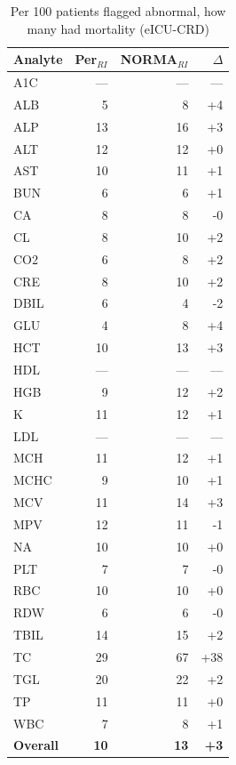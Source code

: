 \begin{table}[ht]
\centering
\footnotesize
\caption{Per 100 patients flagged abnormal, how many had mortality (eICU-CRD)}
\begin{tabular}{lrrr}
\toprule
Analyte & Per$_{RI}$ & NORMA$_{RI}$ & $\Delta$ \\
\midrule
A1C & --- & --- & --- \\
ALB & 5 & 8 & +4 \\
ALP & 13 & 16 & +3 \\
ALT & 12 & 12 & +0 \\
AST & 10 & 11 & +1 \\
BUN & 6 & 6 & +1 \\
CA & 8 & 8 & -0 \\
CL & 8 & 10 & +2 \\
CO2 & 6 & 8 & +2 \\
CRE & 8 & 10 & +2 \\
DBIL & 6 & 4 & -2 \\
GLU & 4 & 8 & +4 \\
HCT & 10 & 13 & +3 \\
HDL & --- & --- & --- \\
HGB & 9 & 12 & +2 \\
K & 11 & 12 & +1 \\
LDL & --- & --- & --- \\
MCH & 11 & 12 & +1 \\
MCHC & 9 & 10 & +1 \\
MCV & 11 & 14 & +3 \\
MPV & 12 & 11 & -1 \\
NA & 10 & 10 & +0 \\
PLT & 7 & 7 & -0 \\
RBC & 10 & 10 & +0 \\
RDW & 6 & 6 & -0 \\
TBIL & 14 & 15 & +2 \\
TC & 29 & 67 & +38 \\
TGL & 20 & 22 & +2 \\
TP & 11 & 11 & +0 \\
WBC & 7 & 8 & +1 \\
\midrule
\textbf{Overall} & \textbf{10} & \textbf{13} & \textbf{+3} \\
\bottomrule
\end{tabular}
\end{table}